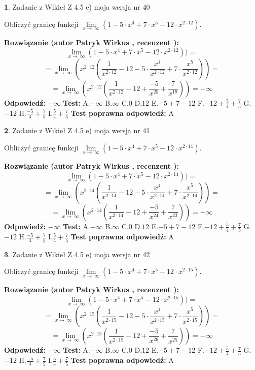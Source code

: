 \documentclass[12pt, a4paper]{article}
\theoremstyle{definition} %
\newtheorem{zad}{}
\newcommand{\zadStart}[1]{\begin{zad}#1\newline}
\newcommand{\zadStop}{\end{zad}}
\newcommand{\rozwStart}[2]{\noindent \textbf{Rozwiązanie (autor #1 , recenzent #2): }\newline}
\newcommand{\rozwStop}{\newline}
\newcommand{\odpStart}{\noindent \textbf{Odpowiedź:}\newline}
\newcommand{\odpStop}{\newline}
\newcommand{\testStart}{\noindent \textbf{Test:}\newline}
\newcommand{\testStop}{\newline}
\newcommand{\kluczStart}{\noindent \textbf{Test poprawna odpowiedź:}\newline}
\newcommand{\kluczStop}{\newline}
\begin{document}
\zadStart{Zadanie z Wikieł Z 4.5 e) moja wersja nr 40}



Obliczyć granicę funkcji  $\lim\limits_{x\to\ \infty}(1 - 5 \cdot x^{4}+7 \cdot x^{5}- 12 \cdot x^{2\cdot12})$.
\zadStop
\rozwStart{Patryk Wirkus}{}
$$\lim\limits_{x\to\ \infty}(1 - 5 \cdot x^{4}+7 \cdot x^{5}- 12 \cdot x^{2\cdot12}))=$$
$$=\lim\limits_{x\to\ \infty}(x^{2\cdot12}(\frac{1}{x^{2\cdot12}}-12 -5 \cdot \frac{x^{4}}{x^{2\cdot12}}+7 \cdot \frac{x^{5}}{x^{2\cdot12}}))=$$
$$=\lim\limits_{x\to\ \infty}(x^{2\cdot12}(\frac{1}{x^{2\cdot12}}-12 + \frac{-5}{x^{20}}+ \frac{7}{x^{19}}))=-\infty$$
\rozwStop
\odpStart
$-\infty$
\odpStop
\testStart
A.$-\infty$ B.$\infty$ C.$0$ D.$12$ E.$-5 + 7 - 12$
F.$-12+\frac{5}{4}+\frac{7}{5}$ G.$-12$
H.$\frac{-5}{4}+\frac{7}{5}$
I.$\frac{5}{4}+\frac{7}{5}$
\testStop
\kluczStart
A
\kluczStop



\zadStart{Zadanie z Wikieł Z 4.5 e) moja wersja nr 41}



Obliczyć granicę funkcji  $\lim\limits_{x\to\ \infty}(1 - 5 \cdot x^{4}+7 \cdot x^{5}- 12 \cdot x^{2\cdot14})$.
\zadStop
\rozwStart{Patryk Wirkus}{}
$$\lim\limits_{x\to\ \infty}(1 - 5 \cdot x^{4}+7 \cdot x^{5}- 12 \cdot x^{2\cdot14}))=$$
$$=\lim\limits_{x\to\ \infty}(x^{2\cdot14}(\frac{1}{x^{2\cdot14}}-12 -5 \cdot \frac{x^{4}}{x^{2\cdot14}}+7 \cdot \frac{x^{5}}{x^{2\cdot14}}))=$$
$$=\lim\limits_{x\to\ \infty}(x^{2\cdot14}(\frac{1}{x^{2\cdot14}}-12 + \frac{-5}{x^{24}}+ \frac{7}{x^{23}}))=-\infty$$
\rozwStop
\odpStart
$-\infty$
\odpStop
\testStart
A.$-\infty$ B.$\infty$ C.$0$ D.$12$ E.$-5 + 7 - 12$
F.$-12+\frac{5}{4}+\frac{7}{5}$ G.$-12$
H.$\frac{-5}{4}+\frac{7}{5}$
I.$\frac{5}{4}+\frac{7}{5}$
\testStop
\kluczStart
A
\kluczStop



\zadStart{Zadanie z Wikieł Z 4.5 e) moja wersja nr 42}



Obliczyć granicę funkcji  $\lim\limits_{x\to\ \infty}(1 - 5 \cdot x^{4}+7 \cdot x^{5}- 12 \cdot x^{2\cdot15})$.
\zadStop
\rozwStart{Patryk Wirkus}{}
$$\lim\limits_{x\to\ \infty}(1 - 5 \cdot x^{4}+7 \cdot x^{5}- 12 \cdot x^{2\cdot15}))=$$
$$=\lim\limits_{x\to\ \infty}(x^{2\cdot15}(\frac{1}{x^{2\cdot15}}-12 -5 \cdot \frac{x^{4}}{x^{2\cdot15}}+7 \cdot \frac{x^{5}}{x^{2\cdot15}}))=$$
$$=\lim\limits_{x\to\ \infty}(x^{2\cdot15}(\frac{1}{x^{2\cdot15}}-12 + \frac{-5}{x^{26}}+ \frac{7}{x^{25}}))=-\infty$$
\rozwStop
\odpStart
$-\infty$
\odpStop
\testStart
A.$-\infty$ B.$\infty$ C.$0$ D.$12$ E.$-5 + 7 - 12$
F.$-12+\frac{5}{4}+\frac{7}{5}$ G.$-12$
H.$\frac{-5}{4}+\frac{7}{5}$
I.$\frac{5}{4}+\frac{7}{5}$
\testStop
\kluczStart
A
\kluczStop
\end{document}
